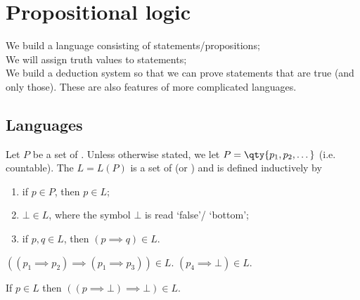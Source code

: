 \section{Propositional logic}

We build a language consisting of statements/propositions; \\
We will assign truth values to statements; \\
We build a deduction system so that we can prove statements that are true (and only those).
These are also features of more complicated languages.

\subsection{Languages}

Let $P$ be a set of .
Unless otherwise stated, we let $P = \qty{p_1, p_2, \dots}$ (i.e. countable).
The  $L = L(P)$ is a set of  (or ) and is defined inductively by
\begin{enumerate}
    \item if $p \in P$, then $p \in L$;
    \item $\bot \in L$, where the symbol $\bot$ is read `false'/ `bottom';
    \item if $p, q \in L$, then $(p \implies q) \in L$.
\end{enumerate}

\begin{example}
    $((p_1 \implies p_2) \implies (p_1 \implies p_3)) \in L$.
    $(p_4 \implies \bot) \in L$.

    If $p \in L$ then $((p \implies \bot) \implies \bot) \in L$.
\end{example}

